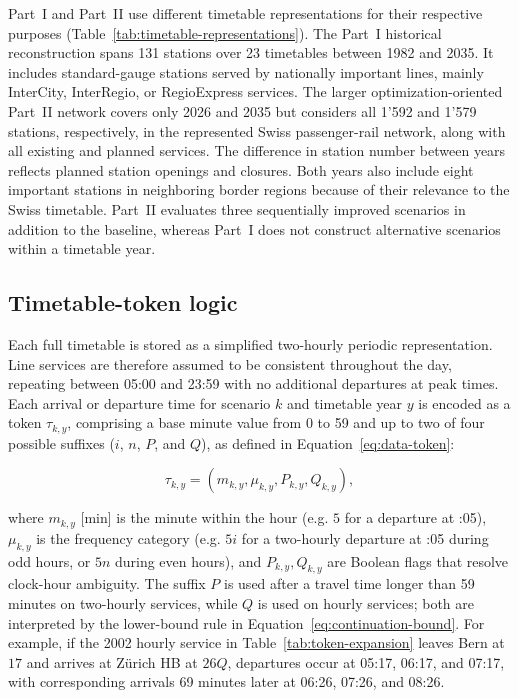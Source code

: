 \documentclass[preprint,12pt]{elsarticle}
\begin{document}
Part~I and Part~II use different timetable representations for their respective purposes (Table~\ref{tab:timetable-representations}). The Part~I historical reconstruction spans 131 stations over 23 timetables between 1982 and 2035. It includes standard-gauge stations served by nationally important lines, mainly InterCity, InterRegio, or RegioExpress services. The larger optimization-oriented Part~II network covers only 2026 and 2035 but considers all 1'592 and 1'579 stations, respectively, in the represented Swiss passenger-rail network, along with all existing and planned services. The difference in station number between years reflects planned station openings and closures. Both years also include eight important stations in neighboring border regions because of their relevance to the Swiss timetable. Part~II evaluates three sequentially improved scenarios in addition to the baseline, whereas Part~I does not construct alternative scenarios within a timetable year.


\subsection{Timetable-token logic}\label{sec:logic}

Each full timetable is stored as a simplified two-hourly periodic representation. Line services are therefore assumed to be consistent throughout the day, repeating between 05:00 and 23:59 with no additional departures at peak times. Each arrival or departure time for scenario \(k\) and timetable year \(y\) is encoded as a token \(\tau_{k,y}\), comprising a base minute value from 0 to 59 and up to two of four possible suffixes (\(i\), \(n\), \(P\), and \(Q\)), as defined in Equation~\eqref{eq:data-token}:

\begin{equation}
\tau_{k,y}=\left(m_{k,y},\mu_{k,y},P_{k,y},Q_{k,y}\right),
\label{eq:data-token}
\end{equation}

where \(m_{k,y}\) [min] is the minute within the hour (e.g. \(5\) for a departure at :05), \(\mu_{k,y}\) is the frequency category (e.g. \(5i\) for a two-hourly departure at :05 during odd hours, or \(5n\) during even hours), and \(P_{k,y},Q_{k,y}\) are Boolean flags that resolve clock-hour ambiguity. The suffix \(P\) is used after a travel time longer than 59 minutes on two-hourly services, while \(Q\) is used on hourly services; both are interpreted by the lower-bound rule in Equation~\eqref{eq:continuation-bound}. For example, if the 2002 hourly service in Table~\ref{tab:token-expansion} leaves Bern at \(17\) and arrives at Zürich HB at \(26Q\), departures occur at 05:17, 06:17, and 07:17, with corresponding arrivals 69 minutes later at 06:26, 07:26, and 08:26.
\end{document}
